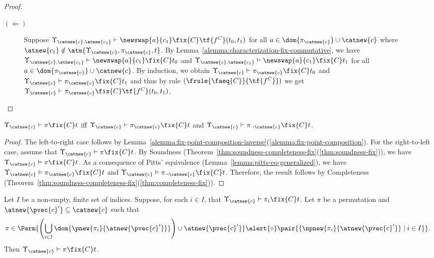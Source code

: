 \begin{proof}
\begin{itemize}
\begin{description}
            \item[$(\Leftarrow)$]  Suppose $\Upsilon_{\catnew{c},\atnew{c_1}} \vdash \newswap{a}{c_1}\fix{C} \tf{f^C}(t_0,t_1)$ for all $a\in \dom{\pi_{\catnew{c}}}\cup\catnew{c}$ where $\atnew{c_1}\notin \atm{\Upsilon_{\catnew{c}},\pi_{\catnew{c}},t}$. By Lemma~\ref{alemma:characterization-fix-commutative}, we have $\Upsilon_{\catnew{c},\atnew{c_1}} \vdash \newswap{a}{c_1}\fix{C} t_0$ and $\Upsilon_{\catnew{c},\atnew{c_1}} \vdash \newswap{a}{c_1}\fix{C} t_1$ for all $a\in \dom{\pi_{\catnew{c}}}\cup\catnew{c}$. By induction, we obtain $\Upsilon_{\catnew{c}} \vdash \pi_{\catnew{c}} \fix{C} t_0$ and $\Upsilon_{\catnew{c}} \vdash \pi_{\catnew{c}} \fix{C} t_1$ and thus by rule $(\frule{\faeq{C}}{\tf{f^C}})$ we get $\Upsilon_{\catnew{c}} \vdash \pi_{\catnew{c}}\fix{C} \tf{f^C}(t_0,t_1)$.
        \end{description}
    \end{itemize}
\end{proof}

\begin{lemma}\label{alemma:fix-point-split}
    $\Upsilon_{\catnew{c}} \vdash \pi \fix{C} t$ iff $\Upsilon_{\catnew{c}} \vdash \pi_{\catnew{c}} \fix{C} t$ and $\Upsilon_{\catnew{c}} \vdash \pi_{\neg\catnew{c}} \fix{C} t$.
\end{lemma}

\begin{proof}
    The left-to-right case follows by Lemma~\ref{alemma:fix-point-composition-inverse}(\ref{alemma:fix-point-composition}). For the right-to-left case, assume that  $\Upsilon_{\catnew{c}} \vdash \pi \fix{C} t$. By Soundness (Theorem~\ref{thm:soundness-completeness-fix}(\ref{thm:soundness-fix})), we have $\Upsilon_{\catnew{c}} \vDash \pi \fix{C} t$. As a consequence of Pitts' equivalence (Lemma~\ref{lemma:pitts-eq-generalized}), we have $\Upsilon_{\catnew{c}} \vDash \pi_{\catnew{c}} \fix{C} t$ and $\Upsilon_{\catnew{c}} \vDash \pi_{\neg\catnew{c}} \fix{C} t$. Therefore, the result follows by Completeness (Theorem~\ref{thm:soundness-completeness-fix}(\ref{thm:completeness-fix})).
\end{proof}

 \begin{lemma}\label{alemma:perm_dec}
     Let $I$ be a non-empty, finite set of indices. Suppose, for each $i\in I$, that $\Upsilon_{\catnew{c}} \vdash \pi_i\fix{C}t$. Let $\pi$ be a permutation and $\atnew{\pvec{c}'}\subseteq \catnew{c}$ such that
     \begin{equation}
         \pi \in \Perm{\left(\bigcup_{i\in I} \dom{\pnew{\pi_i}{\atnew{\pvec{c}'}}}\right)\cup \atnew{\pvec{c}'}}\alert{\circ}\pair{\{\npnew{\pi_i}{\atnew{\pvec{c}'}} \mid i\in I\}}.
     \end{equation}
     Then $\Upsilon_{\catnew{c}} \vdash \pi\fix{C}t$.
\end{lemma}

